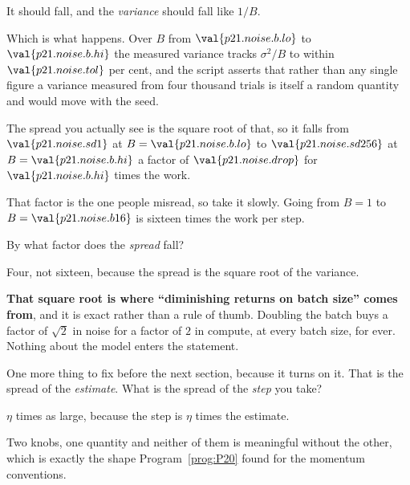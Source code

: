\begin{fr}
\begin{ansblock}
It should fall, and the \emph{variance} should fall like $1/B$.
\end{ansblock}

Which is what happens. Over $B$ from $\val{p21.noise.b.lo}$ to
$\val{p21.noise.b.hi}$ the measured variance tracks $\sigma^{2}/B$ to within
$\val{p21.noise.tol}$ per cent, and the script asserts that rather than any
single figure \dash{} a variance measured from four thousand trials is itself
a random quantity and would move with the seed.

The spread you actually see is the square root of that, so it falls from
$\val{p21.noise.sd1}$ at $B = \val{p21.noise.b.lo}$ to
$\val{p21.noise.sd256}$ at $B = \val{p21.noise.b.hi}$ \dash{} a factor of
$\val{p21.noise.drop}$ for $\val{p21.noise.b.hi}$ times the work.
\end{fr}

\begin{fr}
That factor is the one people misread, so take it slowly. Going from $B = 1$
to $B = \val{p21.noise.b16}$ is sixteen times the work per step.

By what factor does the \emph{spread} fall?
\nextframe
\end{fr}

\begin{fr}
Four, not sixteen, because the spread is the square root of the variance.

\textbf{That square root is where \enquote{diminishing returns on batch size}
comes from}, and it is exact rather than a rule of thumb. Doubling the batch
buys a factor of $\sqrt{2}$ in noise for a factor of $2$ in compute, at every
batch size, for ever. Nothing about the model enters the statement.


One more thing to fix before the next section, because it turns on it. That is
the spread of the \emph{estimate}. What is the spread of the \emph{step} you
take?
\nextframe
\end{fr}

\begin{fr}
\begin{ansblock}
$\eta$ times as large, because the step is $\eta$ times the estimate.
\end{ansblock}

Two knobs, one quantity \dash{} and neither of them is meaningful without the
other, which is exactly the shape Program~\ref{prog:P20} found for the
momentum conventions.
\end{fr}

